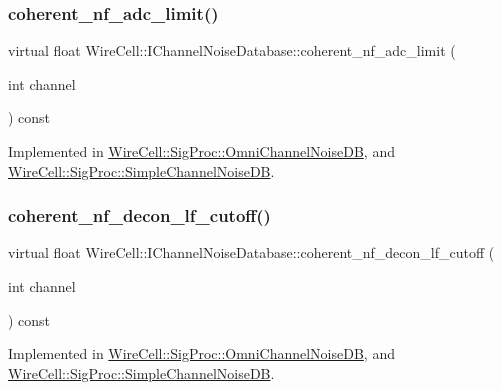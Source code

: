 \subsubsection{\texorpdfstring{coherent\+\_\+nf\+\_\+adc\+\_\+limit()}{coherent\_nf\_adc\_limit()}}
{\footnotesize\ttfamily virtual float Wire\+Cell\+::\+I\+Channel\+Noise\+Database\+::coherent\+\_\+nf\+\_\+adc\+\_\+limit (\begin{DoxyParamCaption}\item[{int}]{channel }\end{DoxyParamCaption}) const\hspace{0.3cm}{\ttfamily [pure virtual]}}



Implemented in \hyperlink{class_wire_cell_1_1_sig_proc_1_1_omni_channel_noise_d_b_abc80cb5a10e48500824f710c3846900d}{Wire\+Cell\+::\+Sig\+Proc\+::\+Omni\+Channel\+Noise\+DB}, and \hyperlink{class_wire_cell_1_1_sig_proc_1_1_simple_channel_noise_d_b_a5c9dfedd62780fe11dafaa0739876803}{Wire\+Cell\+::\+Sig\+Proc\+::\+Simple\+Channel\+Noise\+DB}.

\mbox{\label{class_wire_cell_1_1_i_channel_noise_database_a4104509a65ce9fe5a77fac6ddd39ec56}} 
\subsubsection{\texorpdfstring{coherent\+\_\+nf\+\_\+decon\+\_\+lf\+\_\+cutoff()}{coherent\_nf\_decon\_lf\_cutoff()}}
{\footnotesize\ttfamily virtual float Wire\+Cell\+::\+I\+Channel\+Noise\+Database\+::coherent\+\_\+nf\+\_\+decon\+\_\+lf\+\_\+cutoff (\begin{DoxyParamCaption}\item[{int}]{channel }\end{DoxyParamCaption}) const\hspace{0.3cm}{\ttfamily [pure virtual]}}



Implemented in \hyperlink{class_wire_cell_1_1_sig_proc_1_1_omni_channel_noise_d_b_a43dbea0d5db7c2217f35f7df45dd8b4f}{Wire\+Cell\+::\+Sig\+Proc\+::\+Omni\+Channel\+Noise\+DB}, and \hyperlink{class_wire_cell_1_1_sig_proc_1_1_simple_channel_noise_d_b_a52def69ce297e7fc097b91a4472cbc25}{Wire\+Cell\+::\+Sig\+Proc\+::\+Simple\+Channel\+Noise\+DB}.

